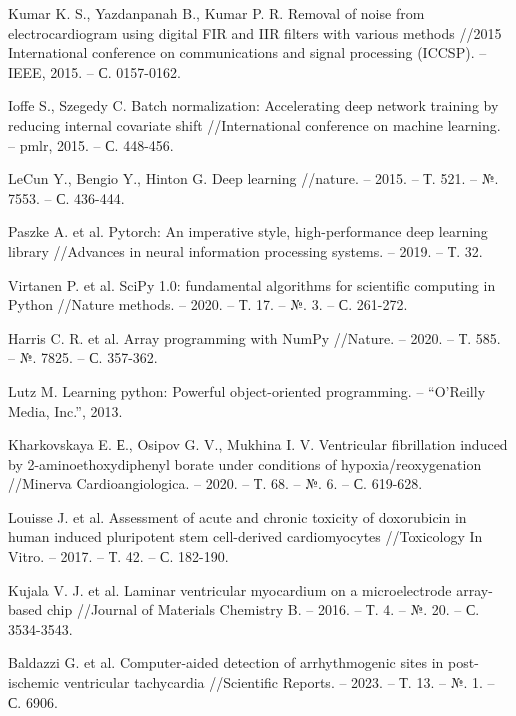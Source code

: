 \begin{thebibliography}{00}
    Kumar K. S., Yazdanpanah B., Kumar P. R. Removal of noise from
    electrocardiogram using digital FIR and IIR filters with various methods
    //2015 International conference on communications and signal processing
    (ICCSP). – IEEE, 2015. – С. 0157-0162.

    Ioffe S., Szegedy C. Batch normalization: Accelerating deep network
    training by reducing internal covariate shift //International conference on
    machine learning. – pmlr, 2015. – С. 448-456.

    LeCun Y., Bengio Y., Hinton G. Deep learning //nature. – 2015. – Т. 521. –
    №. 7553. – С. 436-444.

    Paszke A. et al. Pytorch: An imperative style, high-performance deep
    learning library //Advances in neural information processing systems. –
    2019. – Т. 32.

    Virtanen P. et al. SciPy 1.0: fundamental algorithms for scientific
    computing in Python //Nature methods. – 2020. – Т. 17. – №. 3. – С.
    261-272.

    Harris C. R. et al. Array programming with NumPy //Nature. – 2020. – Т.
    585. – №. 7825. – С. 357-362.

    Lutz M. Learning python: Powerful object-oriented programming. – ``O'Reilly
    Media, Inc.'', 2013.

    Kharkovskaya E. Е., Osipov G. V., Mukhina I. V. Ventricular fibrillation
    induced by 2-aminoethoxydiphenyl borate under conditions of
    hypoxia/reoxygenation //Minerva Cardioangiologica. – 2020. – Т. 68. – №. 6.
    – С. 619-628.

    Louisse J. et al. Assessment of acute and chronic toxicity of doxorubicin
    in human induced pluripotent stem cell-derived cardiomyocytes //Toxicology
    In Vitro. – 2017. – Т. 42. – С. 182-190.

    Kujala V. J. et al. Laminar ventricular myocardium on a microelectrode
    array-based chip //Journal of Materials Chemistry B. – 2016. – Т. 4. – №.
    20. – С. 3534-3543.

    Baldazzi G. et al. Computer-aided detection of arrhythmogenic sites in
    post-ischemic ventricular tachycardia //Scientific Reports. – 2023. – Т.
    13. – №. 1. – С. 6906.


\end{thebibliography}
